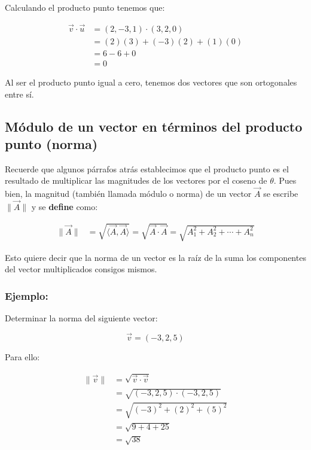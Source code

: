 \documentclass{article}
\begin{document}
            Calculando el producto punto tenemos que:

            \begin{equation*}
                \begin{aligned}
                    \vec{v} \cdot \vec{u} &=(2,-3,1) \cdot(3,2,0) \\
                    &=(2)(3)+(-3)(2)+(1)(0) \\
                    &=6-6+0 \\
                    &=0
                \end{aligned}
            \end{equation*}

            Al ser el producto punto igual a cero, tenemos dos vectores que son ortogonales entre sí.
    
    \subsection{Módulo de un vector en términos del producto punto (norma)}

        Recuerde que algunos párrafos atrás establecimos que el producto punto es el resultado de multiplicar las magnitudes de los vectores por el coseno de $\theta$. Pues bien, la magnitud (también llamada módulo o norma) de un vector $\vec{A}$ se escribe $\parallel\vec{A}\parallel$ y se \textbf{define} como:

        \begin{align}
            \parallel \vec{A}\parallel &= \sqrt{\langle \vec{A}, \vec{A}\rangle} = \sqrt{\vec{A} \cdot \vec{A}} = \sqrt{A_{1}^{2}+A_{2}^{2}+\cdots+A_{n}^{2}}
        \end{align}

        Esto quiere decir que la norma de un vector es la raíz de la suma los componentes del vector multiplicados consigos mismos.

        \subsubsection*{Ejemplo:}

        Determinar la norma del siguiente vector:

        \begin{equation*}
            \vec{v}=(-3,2,5)
        \end{equation*}

        Para ello:

        \begin{equation*}
            \begin{aligned}
            \parallel \vec{v}\parallel &=\sqrt{\vec{v} \cdot \vec{v}} \\
            &=\sqrt{(-3,2,5) \cdot(-3,2,5)} \\
            &=\sqrt{(-3)^{2}+(2)^{2}+(5)^{2}} \\
            &=\sqrt{9+4+25} \\
            &=\sqrt{38}
            \end{aligned}
        \end{equation*}
\end{document}
